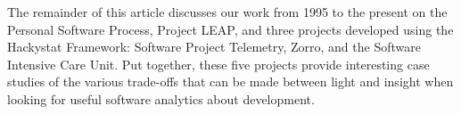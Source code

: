 \documentclass[]{article}
\begin{document}
The remainder of this article discusses our work from 1995 to the present on the Personal
Software Process, Project LEAP, and three projects developed using the Hackystat
Framework: Software Project Telemetry, Zorro, and the Software Intensive Care Unit.  Put
together, these five projects provide interesting case studies of the various trade-offs
that can be made between light and insight when looking for useful software analytics
about development.
\end{document}

